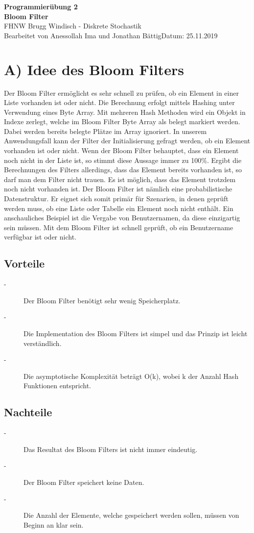 \documentclass[a4paper, 11pt]{article}
\begin{document}
\noindent
\large\textbf{Programmierübung 2} \\
\textbf{Bloom Filter} \\
\normalsize FHNW Brugg Windisch - Diskrete Stochastik \\
Bearbeitet von Anessollah Ima und Jonathan Bättig\hfill Datum: 25.11.2019 \\
 

\section*{A) Idee des Bloom Filters}
Der Bloom Filter ermöglicht es sehr schnell zu prüfen, ob ein Element in einer Liste vorhanden ist oder nicht. Die Berechnung erfolgt mittels Hashing unter Verwendung eines Byte Array. Mit mehreren Hash Methoden wird ein Objekt in Indexe zerlegt, welche im Bloom Filter Byte Array als belegt markiert werden. Dabei werden bereits belegte Plätze im Array ignoriert. In unserem Anwendungsfall kann der Filter der Initialisierung gefragt werden, ob ein Element vorhanden ist oder nicht. Wenn der Bloom Filter behauptet, dass ein Element noch nicht in der Liste ist, so stimmt diese Aussage immer zu 100\%. Ergibt die Berechnungen des Filters allerdings, dass das Element bereits vorhanden ist, so darf man dem Filter nicht trauen. Es ist möglich, dass das Element trotzdem noch nicht vorhanden ist. Der Bloom Filter ist nämlich eine probabilistische Datenstruktur. Er eignet sich somit primär für Szenarien, in denen geprüft werden muss, ob eine Liste oder Tabelle ein Element noch nicht enthält. Ein anschauliches Beispiel ist die Vergabe von Benutzernamen, da diese einzigartig sein müssen. Mit dem Bloom Filter ist schnell geprüft, ob ein Benutzername verfügbar ist oder nicht.
\cite{Wikipedia}
\cite{Youtube}

\subsection{Vorteile}
\begin{description}
\item[-]
Der Bloom Filter benötigt sehr wenig Speicherplatz.
\item[-]
Die Implementation des Bloom Filters ist simpel und das Prinzip ist leicht verständlich.
\item[-]
Die asymptotische Komplexität beträgt O(k), wobei k der Anzahl Hash Funktionen entspricht.
\end{description}

\subsection{Nachteile}
\begin{description}
\item[-]
Das Resultat des Bloom Filters ist nicht immer eindeutig.
\item[-]
Der Bloom Filter speichert keine Daten.
\item[-]
Die Anzahl der Elemente, welche gespeichert werden sollen, müssen von Beginn an klar sein.
\end{description}
\end{document}
